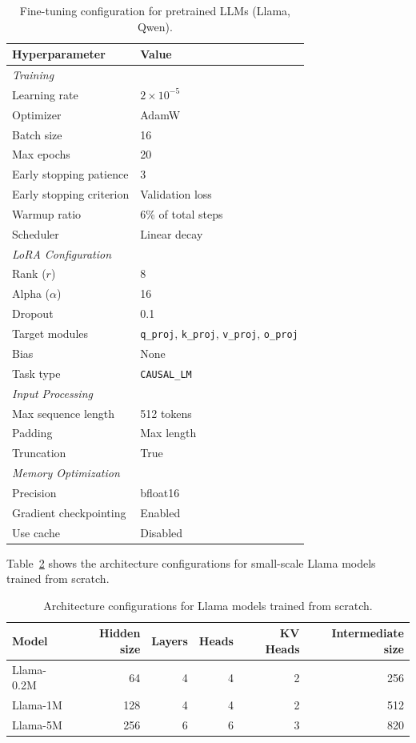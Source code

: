 \begin{table}[h]
\centering
\caption{Fine-tuning configuration for pretrained LLMs (Llama, Qwen).}
\label{tab:llm_config}
\begin{tabular}{ll}
\toprule
Hyperparameter & Value \\
\midrule
\multicolumn{2}{l}{\textit{Training}} \\
Learning rate & $2 \times 10^{-5}$ \\
Optimizer & AdamW \\
Batch size & 16 \\
Max epochs & 20 \\
Early stopping patience & 3 \\
Early stopping criterion & Validation loss \\
Warmup ratio & 6\% of total steps \\
Scheduler & Linear decay \\
\midrule
\multicolumn{2}{l}{\textit{LoRA Configuration}} \\
Rank ($r$) & 8 \\
Alpha ($\alpha$) & 16 \\
Dropout & 0.1 \\
Target modules & \texttt{q\_proj}, \texttt{k\_proj}, \texttt{v\_proj}, \texttt{o\_proj} \\
Bias & None \\
Task type & \texttt{CAUSAL\_LM} \\
\midrule
\multicolumn{2}{l}{\textit{Input Processing}} \\
Max sequence length & 512 tokens \\
Padding & Max length \\
Truncation & True \\
\midrule
\multicolumn{2}{l}{\textit{Memory Optimization}} \\
Precision & bfloat16 \\
Gradient checkpointing & Enabled \\
Use cache & Disabled \\
\bottomrule
\end{tabular}
\end{table}

Table~\ref{tab:tiny_llm_config} shows the architecture configurations for small-scale Llama models trained from scratch.

\begin{table}[h]
\centering
\caption{Architecture configurations for Llama models trained from scratch.}
\label{tab:tiny_llm_config}
\begin{tabular}{lrrrrr}
\toprule
Model & Hidden size & Layers & Heads & KV Heads & Intermediate size \\
\midrule
Llama-0.2M & 64 & 4 & 4 & 2 & 256 \\
Llama-1M & 128 & 4 & 4 & 2 & 512 \\
Llama-5M & 256 & 6 & 6 & 3 & 820 \\
\bottomrule
\end{tabular}
\end{table}

